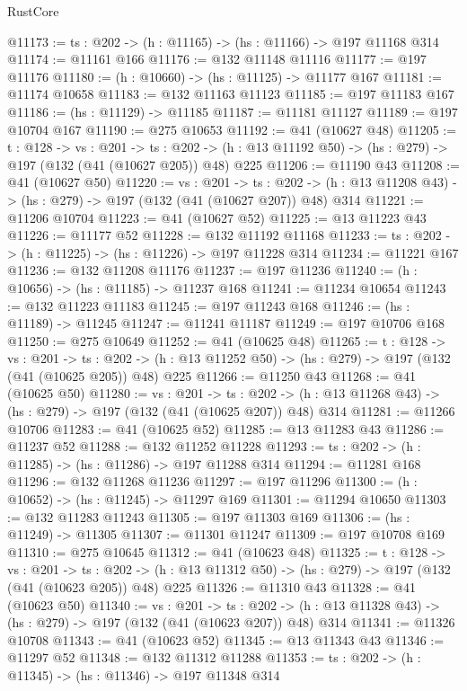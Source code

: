 \begin{lexlean}{RustCore}
\begin{coremodule}
@11173 := {ts : @202} -> (h : @11165) -> (hs : @11166) -> @197 @11168 @314
@11174 := @11161 @166
@11176 := @132 @11148 @11116
@11177 := @197 @11176
@11180 := (h : @10660) -> (hs : @11125) -> @11177 @167
@11181 := @11174 @10658
@11183 := @132 @11163 @11123
@11185 := @197 @11183 @167
@11186 := (hs : @11129) -> @11185
@11187 := @11181 @11127
@11189 := @197 @10704 @167
@11190 := @275 @10653
@11192 := @41 (@10627 @48)
@11205 := {t : @128} ->
  {vs : @201} ->
  {ts : @202} -> (h : @13 @11192 @50) -> (hs : @279) -> @197 (@132 (@41 (@10627 @205)) @48) @225
@11206 := @11190 @43
@11208 := @41 (@10627 @50)
@11220 := {vs : @201} ->
  {ts : @202} -> (h : @13 @11208 @43) -> (hs : @279) -> @197 (@132 (@41 (@10627 @207)) @48) @314
@11221 := @11206 @10704
@11223 := @41 (@10627 @52)
@11225 := @13 @11223 @43
@11226 := @11177 @52
@11228 := @132 @11192 @11168
@11233 := {ts : @202} -> (h : @11225) -> (hs : @11226) -> @197 @11228 @314
@11234 := @11221 @167
@11236 := @132 @11208 @11176
@11237 := @197 @11236
@11240 := (h : @10656) -> (hs : @11185) -> @11237 @168
@11241 := @11234 @10654
@11243 := @132 @11223 @11183
@11245 := @197 @11243 @168
@11246 := (hs : @11189) -> @11245
@11247 := @11241 @11187
@11249 := @197 @10706 @168
@11250 := @275 @10649
@11252 := @41 (@10625 @48)
@11265 := {t : @128} ->
  {vs : @201} ->
  {ts : @202} -> (h : @13 @11252 @50) -> (hs : @279) -> @197 (@132 (@41 (@10625 @205)) @48) @225
@11266 := @11250 @43
@11268 := @41 (@10625 @50)
@11280 := {vs : @201} ->
  {ts : @202} -> (h : @13 @11268 @43) -> (hs : @279) -> @197 (@132 (@41 (@10625 @207)) @48) @314
@11281 := @11266 @10706
@11283 := @41 (@10625 @52)
@11285 := @13 @11283 @43
@11286 := @11237 @52
@11288 := @132 @11252 @11228
@11293 := {ts : @202} -> (h : @11285) -> (hs : @11286) -> @197 @11288 @314
@11294 := @11281 @168
@11296 := @132 @11268 @11236
@11297 := @197 @11296
@11300 := (h : @10652) -> (hs : @11245) -> @11297 @169
@11301 := @11294 @10650
@11303 := @132 @11283 @11243
@11305 := @197 @11303 @169
@11306 := (hs : @11249) -> @11305
@11307 := @11301 @11247
@11309 := @197 @10708 @169
@11310 := @275 @10645
@11312 := @41 (@10623 @48)
@11325 := {t : @128} ->
  {vs : @201} ->
  {ts : @202} -> (h : @13 @11312 @50) -> (hs : @279) -> @197 (@132 (@41 (@10623 @205)) @48) @225
@11326 := @11310 @43
@11328 := @41 (@10623 @50)
@11340 := {vs : @201} ->
  {ts : @202} -> (h : @13 @11328 @43) -> (hs : @279) -> @197 (@132 (@41 (@10623 @207)) @48) @314
@11341 := @11326 @10708
@11343 := @41 (@10623 @52)
@11345 := @13 @11343 @43
@11346 := @11297 @52
@11348 := @132 @11312 @11288
@11353 := {ts : @202} -> (h : @11345) -> (hs : @11346) -> @197 @11348 @314

\end{coremodule}
\end{lexlean}
